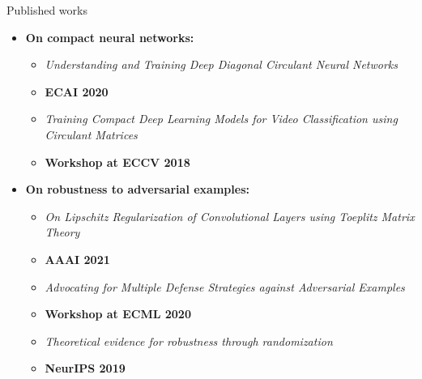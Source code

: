 \begin{frame}{Published works}

  {\small
  \begin{itemize}[leftmargin=0pt]
    \item \textbf{On compact neural networks:} \vspace{0.1cm}
    \begin{itemize}[leftmargin=0.3cm]
      \item \textit{Understanding and Training Deep Diagonal Circulant Neural Networks}
      \item \citet{araujo2020understanding} \hfill \textbf{ECAI 2020}\vspace{0.1cm}
      \item \textit{Training Compact Deep Learning Models for Video Classification using Circulant Matrices}
      \item \citet{araujo2018training} \hfill \textbf{Workshop at ECCV 2018}
    \end{itemize} \vspace{0.3cm}

    \item \textbf{On robustness to adversarial examples:} \vspace{0.1cm}
    \begin{itemize}[leftmargin=0.3cm]
      \item \textit{On Lipschitz Regularization of Convolutional Layers using Toeplitz Matrix Theory}
      \item \citet{araujo2021lipschitz} \hfill \textbf{AAAI 2021}\vspace{0.1cm}
      \item \textit{Advocating for Multiple Defense Strategies against Adversarial Examples}
      \item \citet{araujo2020advocating} \hfill \textbf{Workshop at ECML 2020}\vspace{0.1cm}
      \item \textit{Theoretical evidence for robustness through randomization}
      \item \citet{pinot2019theoretical} \hfill \textbf{NeurIPS 2019}
    \end{itemize}
  \end{itemize}
  }


\end{frame}




